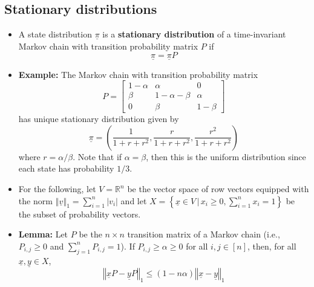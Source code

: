 \documentclass[11pt,twoside]{report}
\newcommand{\vecnot}{\underline}
\begin{document}
\subsection{Stationary distributions} 
  

\begin{itemize}
\item A state distribution $\vecnot{\pi}$ is a \textbf{stationary distribution} of a time-invariant Markov chain with transition probability matrix $P$ if 
\[
\vecnot{\pi} = \vecnot{\pi} P
\]






\item \textbf{Example:} The Markov chain  with transition probability matrix
\[
 P = \begin{bmatrix}
1-\alpha & \alpha & 0\\
\beta & 1- \alpha - \beta & \alpha\\
0 & \beta & 1-\beta
\end{bmatrix}
\]
has unique stationary distribution given by
\[
\vecnot{\pi} = \left( \frac{1}{1 + r + r^2}, \frac{r}{1 + r + r^2}, \frac{r^2}{ 1  + r + r^2}\right)
\]
where $r = \alpha / \beta$. Note that if $\alpha = \beta$, then this is the uniform distribution since each state has probability $1/3$. 




\item For the following, let $V=\mathbb{R}^{n}$ be the vector space of row vectors equipped with the norm $\left\Vert \vecnot v\right\Vert _{1}=\sum_{i=1}^{n}\left|v_{i}\right|$ and let $X=\left\{ \vecnot x\in V\,|\,x_{i}\geq0,\sum_{i=1}^{n}x_{i}=1\right\} $ be the subset of probability vectors.

\item \textbf{Lemma:}  Let $P$ be the $n\times n$ transition matrix of a Markov chain (i.e., $P_{i,j}\geq0$ and $\sum_{j=1}^{n}P_{i,j}=1$). If $P_{i,j}\geq\alpha\geq0$ for all $i,j\in[n]$, then, for all $\vecnot x,\vecnot y\in X$, 
\[
\left\Vert \vecnot xP-\vecnot yP\right\Vert _{1}\leq(1-n\alpha)\left\Vert \vecnot x-\vecnot y\right\Vert _{1}
\]


\end{itemize}
\end{document}
